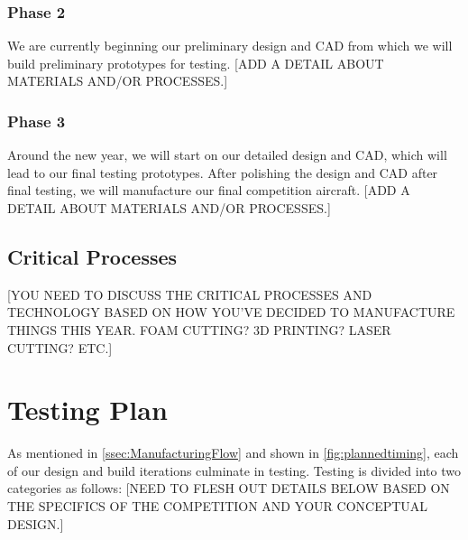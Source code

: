\documentclass[proposal]{byu-aero}
\begin{document}
\subsubsection{Phase 2} We are currently beginning our preliminary design and CAD from which we will build preliminary prototypes for testing. {\color{BYUred}[ADD A DETAIL ABOUT MATERIALS AND/OR PROCESSES.]}

\subsubsection{Phase 3} Around the new year, we will start on our detailed design and CAD, which will lead to our final testing prototypes.  After polishing the design and CAD after final testing, we will manufacture our final competition aircraft. {\color{BYUred}[ADD A DETAIL ABOUT MATERIALS AND/OR PROCESSES.]}



\subsection{Critical Processes}
\label{ssec:CriticalProcesses}

{\color{BYUred}[YOU NEED TO DISCUSS THE CRITICAL PROCESSES AND TECHNOLOGY BASED ON HOW YOU'VE DECIDED TO MANUFACTURE THINGS THIS YEAR.  FOAM CUTTING? 3D PRINTING? LASER CUTTING? ETC.]}
\lipsum[3]





\section{Testing Plan} %
\label{sec:TestingPlan}

As mentioned in \cref{ssec:ManufacturingFlow} and shown in \cref{fig:plannedtiming}, each of our design and build iterations culminate in testing.  Testing is divided into two categories as follows:
{\color{BYUred}[NEED TO FLESH OUT DETAILS BELOW BASED ON THE SPECIFICS OF THE COMPETITION AND YOUR CONCEPTUAL DESIGN.]}
\end{document}
